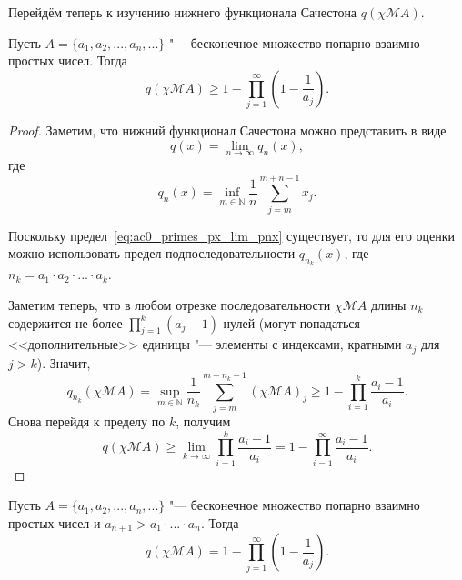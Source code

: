 Перейдём теперь к изучению нижнего функционала Сачестона $q(\chi\mathscr{M}A)$.

\begin{theorem}
	\label{thm:ac0_primes_p_psi_A_prod}
	Пусть $A = \{a_1, a_2, ..., a_n,...\}$ "--- бесконечное множество попарно взаимно простых чисел.
	Тогда
	\begin{equation}
		q(\chi\mathscr{M}A) \geq 1-\prod_{j=1}^\infty \left(1-\frac{1}{a_j}\right)
		.
	\end{equation}
\end{theorem}

\begin{proof}

	Заметим, что нижний функционал Сачестона можно представить в виде
	\begin{equation}
		\label{eq:ac0_primes_px_lim_pnx}
		q(x) = \lim_{n\to\infty} q_n(x)
		,
	\end{equation}
	где
	\begin{equation}
		q_n(x) = \inf_{m\in\mathbb{N}}  \frac{1}{n} \sum_{j=m}^{m+n-1} x_j
		.
	\end{equation}

	Поскольку предел~\eqref{eq:ac0_primes_px_lim_pnx} существует, то для его оценки можно использовать предел подпоследовательности
	$q_{n_k}(x)$, где $n_k = a_1\cdot a_2 \cdot ... \cdot a_k$.

	Заметим теперь, что в любом отрезке последовательности $\chi\mathscr{M}A$ длины $n_k$
	содержится не более $\prod_{j=1}^k (a_j-1)$ нулей
	(могут попадаться <<дополнительные>> единицы "--- элементы с индексами, кратными $a_j$ для $j>k$).
	Значит,
	\begin{equation}
		q_{n_k}(\chi\mathscr{M}A) =
		\sup_{m\in\mathbb{N}}  \frac{1}{n_k} \sum_{j=m}^{m+n_k-1} (\chi\mathscr{M}A)_j
		\geq
		1-\prod_{i=1}^k \frac{a_i-1}{a_i}
		.
	\end{equation}
	Снова перейдя к пределу по $k$, получим
	\begin{equation}
		\label{eq:ac0_primes_p_psi_A_upper_bound}
		q(\chi\mathscr{M}A) \geq \lim_{k\to \infty} \prod_{i=1}^k \frac{a_i-1}{a_i}
		=
		1-\prod_{i=1}^\infty \frac{a_i-1}{a_i}
		.
	\end{equation}

\end{proof}




\begin{corollary}
	\label{cor:ac0_primes_p_psi_A_prod}
	Пусть $A = \{a_1, a_2, ..., a_n,...\}$ "--- бесконечное множество попарно взаимно простых чисел
	и $a_{n+1}>a_1\cdot...\cdot a_n$.
	Тогда
	\begin{equation}
		q(\chi\mathscr{M}A) = 1-\prod_{j=1}^\infty \left(1-\frac{1}{a_j}\right)
		.
	\end{equation}
\end{corollary}

